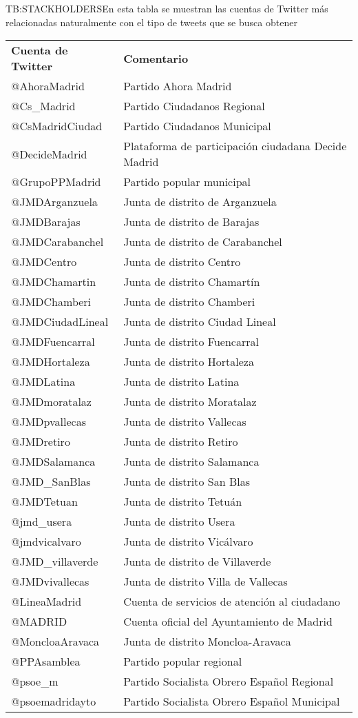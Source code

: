 \begin{table}[Stackholders utilizados para las extracciones]{TB:STACKHOLDERS}{En esta tabla se muestran las cuentas de Twitter más relacionadas naturalmente con el tipo de tweets que se busca obtener}
		\begin{tabular}{|p{4cm}|p{8cm}|}
			\hline
			\textbf{Cuenta de Twitter} & \textbf{Comentario} \\
			@AhoraMadrid & Partido Ahora Madrid\\
			@Cs\_Madrid & Partido Ciudadanos Regional\\
			@CsMadridCiudad & Partido Ciudadanos Municipal\\
			@DecideMadrid & Plataforma de participación ciudadana Decide Madrid \\
			@GrupoPPMadrid & Partido popular municipal \\
			@JMDArganzuela & Junta de distrito de Arganzuela\\
			@JMDBarajas & Junta de distrito de Barajas\\
			@JMDCarabanchel & Junta de distrito de Carabanchel\\
			@JMDCentro & Junta de distrito Centro\\
			@JMDChamartin & Junta de distrito Chamartín \\
			@JMDChamberi & Junta de distrito Chamberi\\
			@JMDCiudadLineal & Junta de distrito Ciudad Lineal \\
			@JMDFuencarral & Junta de distrito Fuencarral\\
			@JMDHortaleza & Junta de distrito Hortaleza \\
			@JMDLatina & Junta de distrito Latina\\
			@JMDmoratalaz & Junta de distrito Moratalaz\\
			@JMDpvallecas & Junta de distrito Vallecas\\
			@JMDretiro & Junta de distrito Retiro\\
			@JMDSalamanca & Junta de distrito Salamanca\\
			@JMD\_SanBlas & Junta de distrito San Blas \\
			@JMDTetuan & Junta de distrito Tetuán \\
			@jmd\_usera & Junta de distrito Usera\\
			@jmdvicalvaro & Junta de distrito Vicálvaro\\
			@JMD\_villaverde & Junta de distrito de Villaverde\\
			@JMDvivallecas & Junta de distrito Villa de Vallecas\\
			@LineaMadrid & Cuenta de servicios de atención al ciudadano\\
			@MADRID & Cuenta oficial del Ayuntamiento de Madrid\\
			@MoncloaAravaca & Junta de distrito Moncloa-Aravaca\\
			@PPAsamblea & Partido popular regional\\
			@psoe\_m & Partido Socialista Obrero Español Regional\\
			@psoemadridayto & Partido Socialista Obrero Español Municipal\\
			\hline \hline
			\hline
		\end{tabular}
\end{table}